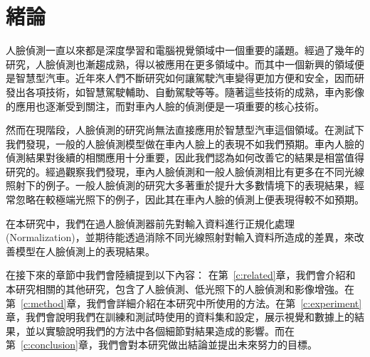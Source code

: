 \chapter{緒論}
\label{c:intro}

人臉偵測一直以來都是深度學習和電腦視覺領域中一個重要的議題。經過了幾年的研究，人臉偵測也漸趨成熟，得以被應用在更多領域中。而其中一個新興的領域便是智慧型汽車。近年來人們不斷研究如何讓駕駛汽車變得更加方便和安全，因而研發出各項技術，如智慧駕駛輔助、自動駕駛等等。隨著這些技術的成熟，車內影像的應用也逐漸受到關注，而對車內人臉的偵測便是一項重要的核心技術。

然而在現階段，人臉偵測的研究尚無法直接應用於智慧型汽車這個領域。在測試下我們發現，一般的人臉偵測模型做在車內人臉上的表現不如我們預期。車內人臉的偵測結果對後續的相關應用十分重要，因此我們認為如何改善它的結果是相當值得研究的。經過觀察我們發現，車內人臉偵測和一般人臉偵測相比有更多在不同光線照射下的例子。一般人臉偵測的研究大多著重於提升大多數情境下的表現結果，經常忽略在較極端光照下的例子，因此其在車內人臉的偵測上便表現得較不如預期。

在本研究中，我們在過人臉偵測器前先對輸入資料進行正規化處理 (Normalization)，並期待能透過消除不同光線照射對輸入資料所造成的差異，來改善模型在人臉偵測上的表現結果。

在接下來的章節中我們會陸續提到以下內容：
在第~\ref{c:related}章，我們會介紹和本研究相關的其他研究，包含了人臉偵測、低光照下的人臉偵測和影像增強。在第~\ref{c:method}章，我們會詳細介紹在本研究中所使用的方法。在第~\ref{c:experiment}章，我們會說明我們在訓練和測試時使用的資料集和設定，展示視覺和數據上的結果，並以實驗說明我們的方法中各個細節對結果造成的影響。而在第~\ref{c:conclusion}章，我們會對本研究做出結論並提出未來努力的目標。
